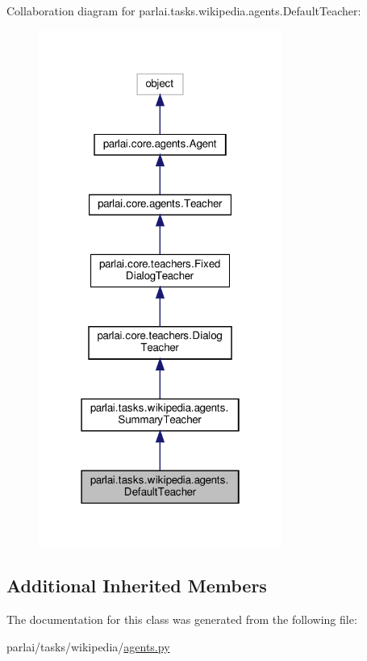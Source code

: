 Collaboration diagram for parlai.\+tasks.\+wikipedia.\+agents.\+Default\+Teacher\+:
\nopagebreak
\begin{figure}[H]
\begin{center}
\leavevmode
\includegraphics[width=226pt]{classparlai_1_1tasks_1_1wikipedia_1_1agents_1_1DefaultTeacher__coll__graph}
\end{center}
\end{figure}
\subsection*{Additional Inherited Members}


The documentation for this class was generated from the following file\+:\begin{DoxyCompactItemize}
\item 
parlai/tasks/wikipedia/\hyperlink{parlai_2tasks_2wikipedia_2agents_8py}{agents.\+py}\end{DoxyCompactItemize}
